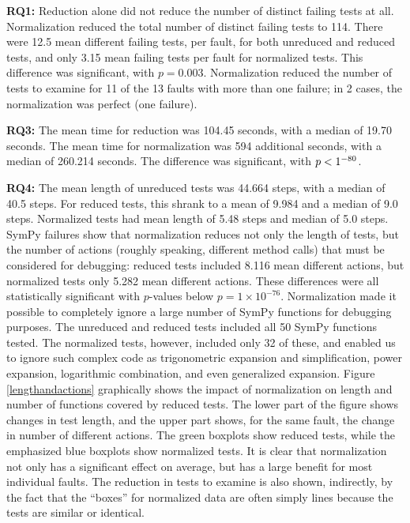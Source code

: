 {\bf RQ1:} Reduction alone did not reduce the number of distinct failing tests at
all.  Normalization reduced the total number of distinct
failing tests to 114.  There were
12.5 mean different failing tests, per fault, for both unreduced and
reduced tests, and only 3.15 mean failing tests per fault for
normalized tests.  This difference was significant, with $p=0.003$.
Normalization reduced the number of tests to
examine for 11 of the 13 faults with more than one failure; in 2 cases, the normalization was perfect (one failure).

{\bf RQ3:} The mean time for reduction was 104.45 seconds, with a
median of 19.70 seconds.  The mean time for normalization was
594 additional seconds, with a median of 260.214 seconds.  The
difference was significant, with $p<1\time10^{-80}$.

{\bf RQ4:} The mean length of unreduced tests was 44.664 steps, with a median
of 40.5 steps.  For reduced tests, this shrank to a mean of
9.984 and a median of 9.0 steps.  Normalized tests had mean length of
5.48 steps and median of 5.0 steps.  SymPy failures show
that normalization reduces not only the length of tests, but the number of
actions (roughly speaking, different method calls) that must be considered for debugging:  reduced tests included
8.116 mean different actions, but normalized tests only 5.282
mean different actions.  These differences were all statistically
significant with $p$-values below $p=1\times10^{-76}$.  
Normalization made it possible to completely ignore a large number of
SymPy functions for debugging purposes.  The unreduced and reduced
tests included all 50 SymPy functions tested.  The normalized tests,
however, included only 32 of these, and enabled us to ignore such
complex code as trigonometric expansion and simplification, power expansion,
logarithmic combination, and even generalized expansion.  Figure
\ref{lengthandactions} graphically shows the impact of normalization
on length and number of functions covered by reduced tests.  The lower
part of the figure shows changes in test length, and the upper part
shows, for the same fault, the change in number of different actions.
The green boxplots show reduced tests, while the emphasized blue
boxplots show normalized tests.  It is clear that normalization not
only has a significant effect on average, but has a large benefit for
most individual faults.  The reduction in tests to examine
is also shown, indirectly, by the fact that the ``boxes'' for
normalized data are often simply lines because the tests are similar or identical.

